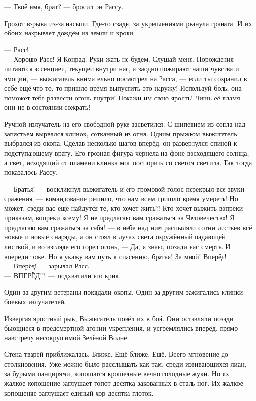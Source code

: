 \noindent --- Твоё имя, брат? --- бросил он Рассу.

Грохот взрыва из-за насыпи. Где-то сзади, за укреплениями рванула граната. И их 
обоих накрывает дождём из земли и крови.

\noindent--- Расс!\\
--- Хорошо Расс! Я Конрад. Руки жать не будем. Слушай меня. Порождения питаются 
эссенцией, текущей внутри нас, а заодно пожирают наши чувства и эмоции, --- 
выжигатель внимательно посмотрел на Расса, --- если ты сохранил в себе ещё 
что-то, то пришло время выпустить это наружу! Используй боль, она поможет тебе 
развести огонь внутри! Покажи им свою ярость! Лишь её пламя они не в состоянии 
сожрать!

Ручной излучатель на его свободной руке засветился. С шипением из сопла над 
запястьем вырвался клинок, сотканный из огня. Одним прыжком выжигатель выбрался 
из окопа. Сделав несколько шагов вперёд, он развернулся спиной к подступающему 
врагу. Его грозная фигура чёрнела на фоне восходящего солнца, а свет, исходящий 
от пламени клинка мог поспорить со светом светила. Так тогда показалось Рассу.

\noindent --- Братья! --- воскликнул выжигатель и его громовой голос перекрыл 
все звуки сражения, --- командование решило, что нам  всем пришло время 
умереть! Но может, среди вас ещё найдутся те, кто хочет жить?! Кто хочет выжить 
вопреки приказам, вопреки всему! Я не предлагаю вам сражаться за Человечество! 
Я предлагаю вам сражаться за себя! --- в небе над ним распыляли сотни листьев 
всё новые и новые снаряды, а он стоял в лучах света окружённый падающей листвой, 
и во взгляде его горел огонь, --- Да, я знаю, позади нас смерть. И впереди 
тоже. Но я укажу вам путь к спасению, братья! За мной! Вперёд!\\
--- Вперёд! --- зарычал Расс.\\ 
--- ВПЕРЁД!!! --- подхватили его крик. 

Один за другим ветераны покидали окопы. Один за другим зажигались клинки боевых излучателей.

Извергая яростный рык, Выжигатель повёл их в бой. Они оставляли позади бьющиеся 
в предсмертной агонии укрепления, и устремлялись вперёд, прямо навстречу 
несокрушимой Зелёной Волне.

Стена тварей приближалась. Ближе. Ещё ближе. Ещё. Всего мгновение до 
столкновения. Уже можно было расслышать как там, среди извивающихся лиан, за 
бурыми панцирями, копошатся крошечные вечно голодные жуки. Но их жалкое 
копошение заглушает топот десятка закованных в сталь ног. Их жалкое копошение 
заглушает единый хор десятка глоток.

